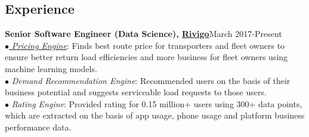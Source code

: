 \documentclass[margin,line]{resume}
\begin{document}
\begin{resume}

    \section{\mysidestyle \bf Experience}
    {\bf Senior Software Engineer (Data Science), \href{https://www.rivigo.com/}{Rivigo}}\label{sec:\mysidestyle\bfexperience}\hfill March 2017-Present\\
      $\bullet$\href{https://eng.rivigo.com/technology/dynamic-prediction-of-trucking-freight-prices-to-digitize-the-indian-trucking-economy/}{ \emph{ Pricing Engine}}:
    Finds best route price for transporters and fleet owners to ensure better return load efficiencies and more business for fleet owners using machine learning models.\\
  $\bullet$ \emph{Demand Recommendation Engine}:
  Recommended users on the basis of their business potential and suggests serviceable load requests to those users. \\
    $\bullet$ \emph{Rating Engine}:
    Provided rating for 0.15 million+ users using 300+ data points, which are extracted on the basis of app usage, phone usage and platform business performance data.


\end{resume}
\end{document}
